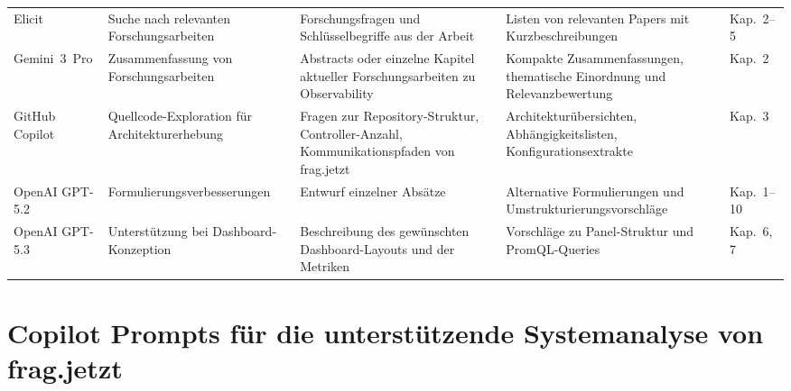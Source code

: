 \begin{landscape}
\begin{longtable}{@{} p{3cm} p{3.5cm} p{5cm} p{5cm} p{2cm} @{}}
Elicit & Suche nach relevanten Forschungsarbeiten & Forschungsfragen und Schlüsselbegriffe aus der Arbeit & Listen von relevanten Papers mit Kurzbeschreibungen & Kap.~2--5 \\[0.5ex]

Gemini~3~Pro & Zusammenfassung von Forschungsarbeiten & Abstracts oder einzelne Kapitel aktueller Forschungsarbeiten zu Observability & Kompakte Zusammenfassungen, thematische Einordnung und Relevanzbewertung & Kap.~2 \\[0.5ex]

GitHub Copilot & Quellcode-Exploration für Architekturerhebung & Fragen zur Repository-Struktur, Controller-Anzahl, Kommunikationspfaden von frag.jetzt & Architekturübersichten, Abhängigkeitslisten, Konfigurationsextrakte & Kap.~3 \\[0.5ex]

OpenAI GPT-5.2 & Formulierungs\-verbesserungen & Entwurf einzelner Absätze & Alternative Formulierungen und Umstrukturierungsvorschläge & Kap.~1--10 \\[0.5ex]

OpenAI GPT-5.3 & Unterstützung bei Dashboard-Konzeption & Beschreibung des gewünschten Dashboard-Layouts und der Metriken & Vorschläge zu Panel-Struktur und PromQL-Queries & Kap.~6, 7 \\[0.5ex]


\end{longtable}
\endgroup

\end{landscape}
\newpage


\section{Copilot Prompts für die unterstützende Systemanalyse von frag.jetzt}
\label{sec:anhang-copilot-prompts}

